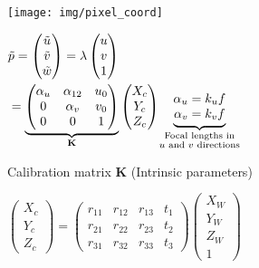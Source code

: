 \documentclass[fontsize=6pt]{scrartcl}
\newcommand{\mat}[1]{\mathbf{#1}}
\begin{document}
\begin{multicols*}{4}
\begin{minipage}{0.35\linewidth}
	\texttt{[image: img/pixel\_coord]}
\end{minipage}
\begin{minipage}{0.65\linewidth}
	$
	\begin{aligned}
	&\tilde{p}
	=
	\begin{pmatrix}
	\tilde{u}\\
	\tilde{v}\\
	\tilde{w}\\
	\end{pmatrix}
	=
	\lambda
	\begin{pmatrix}
	u\\
	v\\
	1\\
	\end{pmatrix}
	\\
	&=
	\underbrace{
	\begin{pmatrix}
	\alpha_u & \alpha_{12} & u_0\\
	0 & \alpha_v & v_0\\
	0 & 0 & 1
	\end{pmatrix}
	}_{\mat K}
	\begin{pmatrix}
	X_c\\
	Y_c\\
	Z_c
	\end{pmatrix}
	\quad
	\underbrace{
	\begin{matrix}
	\alpha_u = k_u f\\
	\alpha_v = k_v f\\
	\end{matrix}
	}_{\mathclap{\substack{\text{Focal lengths in}\\ \text{$u$ and $v$ directions}}}}
	\end{aligned}
	$
\end{minipage}

Calibration matrix $\mat K$ (Intrinsic parameters)

$
\begin{pmatrix}
X_c\\
Y_c\\
Z_c
\end{pmatrix}
=
\left(\begin{array}{ccc|c}
r_{11} & r_{12} & r_{13} & t_1\\
r_{21} & r_{22} & r_{23} & t_2\\
r_{31} & r_{32} & r_{33} & t_3
\end{array}\right)
\begin{pmatrix}
X_W\\
Y_W\\
Z_W\\
1
\end{pmatrix}
$


\end{multicols*}
\end{document}
